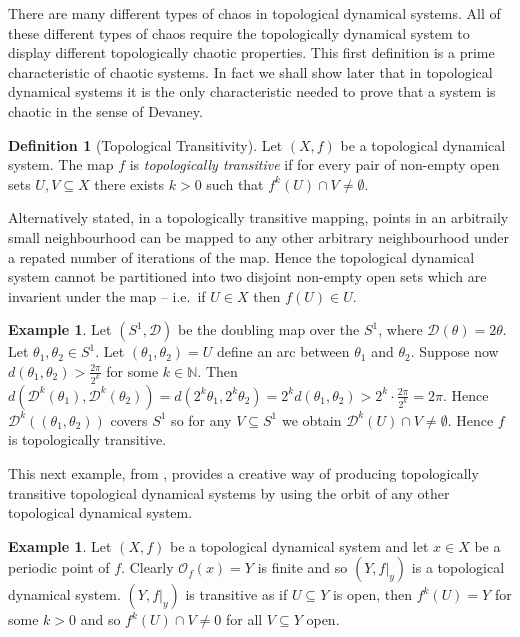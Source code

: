\documentclass[11pt,a4paper,oneside]{memoir}
\theoremstyle{plain}
\theoremstyle{definition}
\newtheorem{defn}[thm]{Definition}
\newtheorem{exmp}[thm]{Example}
\begin{document}
There are many different types of chaos in topological dynamical systems. All of these different types of chaos require the topologically dynamical system to display different topologically chaotic properties.
This first definition is a prime characteristic of chaotic systems. In fact we shall show later that in topological dynamical systems it is the only characteristic needed to prove that a system is chaotic in the sense of Devaney.

\begin{defn}[Topological Transitivity] \label{defn:topological-transitivity}
    Let $(X, f)$ be a topological dynamical system. The map $f$ is \emph{topologically transitive} if for every pair of non-empty open sets $U, V \subseteq X$ there exists $k > 0$ such that $f^k(U) \cap V \neq \emptyset$.
\end{defn}

Alternatively stated, in a topologically transitive mapping, points in an arbitraily small neighbourhood can be mapped to any other arbitrary neighbourhood under a repated number of iterations of the map. Hence the topological dynamical system cannot be partitioned into two disjoint non-empty open sets which are invarient under the map -- i.e.\ if $U \in X$ then $f(U) \in U$.

\begin{exmp}
    Let $(S^1, \mathcal{D})$ be the doubling map over the $S^1$, where $\mathcal{D}(\theta) = 2\theta$. Let $\theta_1, \theta_2 \in S^1$. Let $(\theta_1, \theta_2) = U$ define an arc between $\theta_1$ and $\theta_2$. Suppose now $d\left(\theta_1, \theta_2\right) > \frac{2\pi}{2^k}$ for some $k \in \mathbb{N}$. Then $d\left(\mathcal{D}^k(\theta_1), \mathcal{D}^k(\theta_2)\right) = d\left( 2^k\theta_1, 2^k\theta_2 \right) = 2^k d\left( \theta_1, \theta_2 \right) > 2^k \cdot \frac{2\pi}{2^k} = 2\pi$. Hence $\mathcal{D}^k((\theta_1, \theta_2))$ covers $S^1$ so for any $V \subseteq S^1$ we obtain $\mathcal{D}^k(U) \cap V \neq \emptyset$. Hence $f$ is topologically transitive.
\end{exmp}

This next example, from \cite{kolyada-snoha}, provides a creative way of producing topologically transitive topological dynamical systems by using the orbit of any other topological dynamical system.

\begin{exmp}
    Let $(X, f)$ be a topological dynamical system and let $x \in X$ be a periodic point of $f$. Clearly $\mathcal{O}_f(x) = Y$ is finite and so $(Y, f|_y)$ is a topological dynamical system. $(Y, f|_y)$ is transitive as if $U \subseteq Y$ is open, then $f^k(U) = Y$ for some $k > 0$ and so $f^k(U) \cap V \neq 0$ for all $V \subseteq Y$ open.
\end{exmp}
\end{document}
